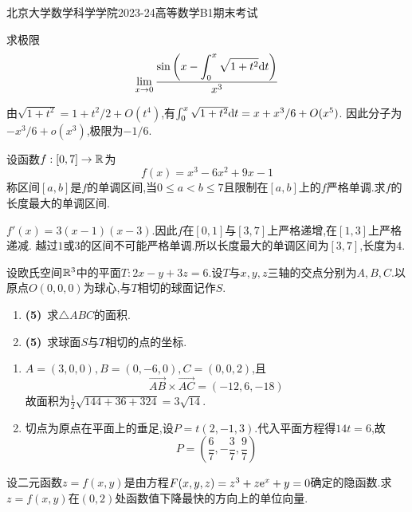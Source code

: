 \documentclass{ctexart}
\begin{document}
\pagestyle{empty}
\begin{center}\Large
北京大学数学科学学院2023-24高等数学B1期末考试
\end{center}
\begin{problem}[1.(10\songti{分})]
求极限\[\lim_{x\to0}\dfrac{\sin\left(x-\displaystyle\int_0^x\sqrt{1+t^2}\mathrm{d} t\right)}{x^3}\]
\end{problem}
\begin{solution}
由$\sqrt{1+t^2}=1+t^2/2+O(t^4)$,有$\int_0^x\sqrt{1+t^2}\mathrm{d} t=x+x^3/6+O(x^5)$.
因此分子为$-x^3/6+o(x^3)$,极限为$-1/6$.
\end{solution}
\begin{problem}[2.(10\songti{分})]
设函数$f:[0,7]\to\mathbb{R}$为\[f(x)=x^3-6x^2+9x-1\]称区间$[a,b]$是$f$的单调区间,当$0\leqslant a<b\leqslant 7$且限制在$[a,b]$上的$f$严格单调.求$f$的长度最大的单调区间.
\end{problem}
\begin{solution}
$f'(x)=3(x-1)(x-3)$.因此$f$在$[0,1]$与$[3,7]$上严格递增,在$[1,3]$上严格递减.
越过$1$或$3$的区间不可能严格单调.所以长度最大的单调区间为$[3,7]$,长度为$4$.
\end{solution}
\begin{problem}[3.(10\songti{分})]
设欧氏空间$\mathbb{R}^3$中的平面$T:2x-y+3z=6$.设$T$与$x,y,z$三轴的交点分别为$A,B,C$.以原点$O(0,0,0)$为球心,与$T$相切的球面记作$S$.
        \begin{enumerate}[label=\tbf{(\arabic*)}]
            \item \textbf{(5)}\ 求$\triangle ABC$的面积.
            \item \textbf{(5)}\ 求球面$S$与$T$相切的点的坐标.
        \end{enumerate}
\end{problem}
\begin{solution}
\begin{enumerate}[label=\tbf{(\arabic*)},leftmargin=*]
\item $A=(3,0,0),B=(0,-6,0),C=(0,0,2)$,且
\[\overrightarrow{AB}\times\overrightarrow{AC}=(-12,6,-18)\]
故面积为$\frac12\sqrt{144+36+324}=3\sqrt{14}$.
\item 切点为原点在平面上的垂足,设$P=t(2,-1,3)$.代入平面方程得$14t=6$,故
\[P=\left(\dfrac67,-\dfrac37,\dfrac97\right)\]
\end{enumerate}
\end{solution}
\begin{problem}[4.(10\songti{分})]
设二元函数$z=f(x,y)$是由方程$F(x,y,z)=z^3+z\mathrm{e}^x+y=0$确定的隐函数.求$z=f(x,y)$在$(0,2)$处函数值下降最快的方向上的单位向量.
\end{problem}
\end{document}
